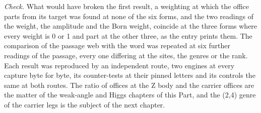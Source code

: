 \begin{chproof}[exact]
\emph{Check.} What would have broken the first result, a weighting at which the office parts from its target was found at none of the six forms, and the two readings of the weight, the amplitude and the Born weight, coincide at the three forms where every weight is 0 or 1 and part at the other three, as the entry prints them. The comparison of the passage web with the word was repeated at six further readings of the passage, every one differing at the sites, the genres or the rank. Each result was reproduced by an independent route, two engines at every capture byte for byte, its counter-tests at their pinned letters and its controls the same at both routes.
The ratio of offices at the Z body and the carrier offices are the matter of the weak-angle and Higgs chapters of this Part, and the (2,4) genre of the carrier legs is the subject of the next chapter.
\end{chproof}
\label{chend:VI-2-w-and-the-z-and-their-masses}
